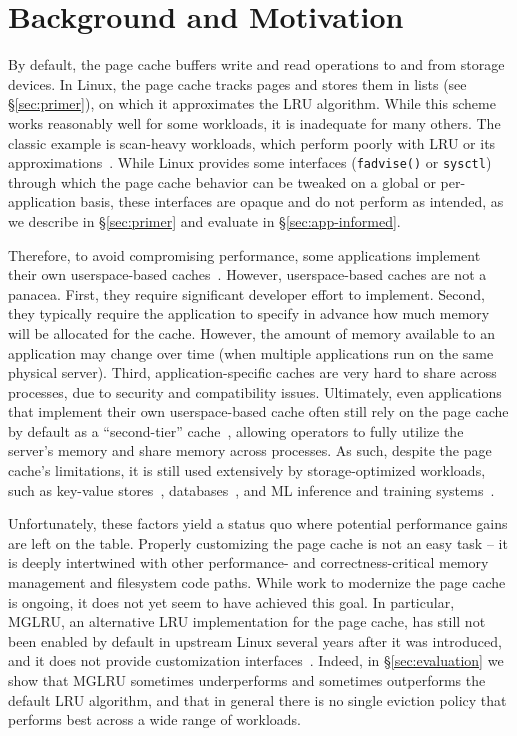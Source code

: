 \section{Background and Motivation}
\label{sec:background}

By default, the page cache buffers write and read operations to and from storage devices. %
In Linux, the page cache tracks pages and stores them in lists (see \S\ref{sec:primer}), on which it approximates the LRU algorithm.
While this scheme works reasonably well for some workloads, it is inadequate for many others. The classic example is scan-heavy workloads, which perform poorly with LRU or its approximations~\cite{lhd,stonebraker_support,arc}. While Linux provides some interfaces (\eg \texttt{fadvise()} or \texttt{sysctl}) through which the page cache behavior can be tweaked on a global or per-application basis, these interfaces are opaque and do not perform as intended, as we describe in \S\ref{sec:primer} and evaluate in \S\ref{sec:app-informed}.

Therefore, to avoid compromising performance, some applications implement their own userspace-based caches~\cite{memory-rocksdb,wiredtiger,postgres-cache,innodb}. However, userspace-based caches are not a panacea. First, they require significant developer effort to implement. Second, they typically require the application to specify in advance how much memory will be allocated for the cache. However, the amount of memory available to an application may change over time (\eg when multiple applications run on the same physical server). Third, application-specific caches are very hard to share across processes, due to security and compatibility issues. Ultimately, even applications that implement their own userspace-based cache often still rely on the page cache by default as a ``second-tier'' cache~\cite{memory-rocksdb,wiredtiger,postgres-cache}, allowing operators to fully utilize the server's memory and share memory across processes.
As such, despite the page cache's limitations, it is still used extensively by storage-optimized workloads, such as key-value stores~\cite{rocksdb,leveldb,wiredtiger}, databases~\cite{postgres,innodb}, and ML inference and training systems~\cite{pytorch-load,milvus-load}.

Unfortunately, these factors yield a status quo where potential performance gains are left on the table. Properly customizing the page cache is not an easy task -- it is deeply intertwined with other performance- and correctness-critical memory management and filesystem code paths. While work to modernize the page cache is ongoing, it does not yet seem to have achieved this goal. In particular, MGLRU, an alternative LRU implementation for the page cache, has still not been enabled by default in upstream Linux several years after it was introduced, %
and it does not provide customization interfaces~\cite{mglru,mglru2}. %
Indeed, in \S\ref{sec:evaluation} we show that MGLRU sometimes underperforms and sometimes outperforms the default LRU algorithm, and that in general there is no single eviction policy that performs best across a wide range of workloads.

